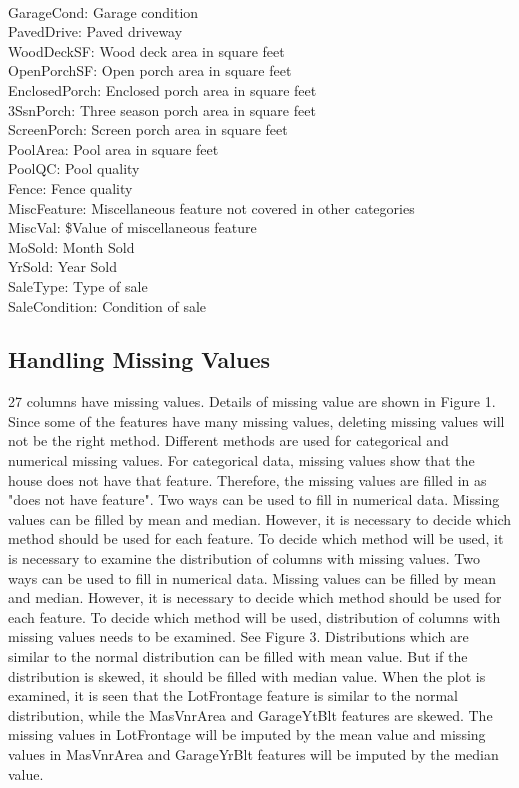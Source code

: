 \documentclass[onecolumn]{article}
\begin{document}
\begin{multicols}{3}
{\\GarageCond: Garage condition
\\PavedDrive: Paved driveway
\\WoodDeckSF: Wood deck area in square feet
\\OpenPorchSF: Open porch area in square feet
\\EnclosedPorch: Enclosed porch area in square feet
\\3SsnPorch: Three season porch area in square feet
\\ScreenPorch: Screen porch area in square feet
\\PoolArea: Pool area in square feet
\\PoolQC: Pool quality
\\Fence: Fence quality
\\MiscFeature: Miscellaneous feature not covered in other categories
\\MiscVal: \$Value of miscellaneous feature
\\MoSold: Month Sold
\\YrSold: Year Sold
\\SaleType: Type of sale
\\SaleCondition: Condition of sale}

\end{multicols}


\subsection{Handling Missing Values}
27 columns have missing values. Details of missing value are shown in Figure 1. Since some of the features have many missing values, deleting missing values will not be the right method. Different methods are used for categorical and numerical missing values. For categorical data, missing values show that the house does not have that feature. Therefore, the missing values are filled in as "does not have feature". Two ways can be used to fill in numerical data. Missing values can be filled by mean and median. However, it is necessary to decide which method should be used for each feature. To decide which method will be used, it is necessary to examine the distribution of columns with missing values. Two ways can be used to fill in numerical data. Missing values can be filled by mean and median. However, it is necessary to decide which method should be used for each feature. To decide which method will be used, distribution of columns  with missing values needs to be examined. See Figure 3. Distributions which are similar to the normal distribution can be filled with mean value. But if the distribution is skewed, it should be filled with median value. When the plot is examined, it is seen that the LotFrontage feature is similar to the normal distribution, while the MasVnrArea and GarageYtBlt features are skewed. The missing values in LotFrontage will be imputed by the mean value and missing values in MasVnrArea and GarageYrBlt features will be imputed by the median value. 
\end{document}
